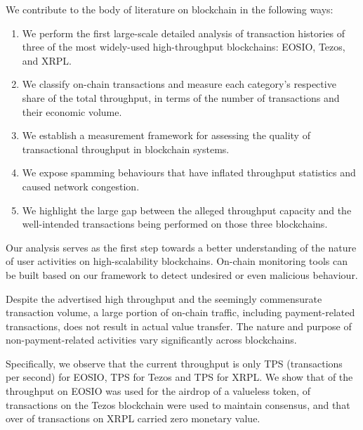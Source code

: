 We contribute to the body of literature on blockchain in the following ways:  
\begin{enumerate}%
\item We perform the first large-scale detailed analysis of transaction histories of three of the most widely-used high-throughput blockchains: EOSIO, Tezos, and XRPL.

\item We classify on-chain transactions and measure each category's respective share of the total throughput, in terms of the number of transactions and their economic volume.

\item We establish a measurement framework for assessing the quality of transactional throughput in blockchain systems.

\item We expose spamming behaviours that have inflated throughput statistics and caused network congestion.

\item We highlight the large gap between the alleged throughput capacity and the well-intended transactions being performed on those three blockchains.
\end{enumerate}
%
Our analysis serves as the first step towards a better understanding of the nature of user activities on high-scalability blockchains. On-chain monitoring tools can be built based on our framework to detect undesired or even malicious behaviour.

Despite the advertised high throughput and the seemingly commensurate transaction volume, a large portion of on-chain traffic, including payment-related transactions, does not result in actual value transfer. 
The nature and purpose of non-payment-related activities vary significantly across blockchains.

Specifically, we observe that the current throughput is only TPS (transactions per second) for EOSIO,  TPS for Tezos and  TPS for XRPL.
We show that  of the throughput on EOSIO was used for the airdrop of a valueless token,  of transactions on the Tezos blockchain were used to maintain consensus,
and that over  of transactions on XRPL carried zero monetary value.
